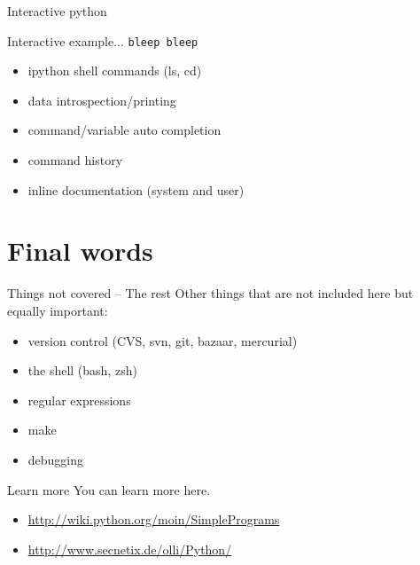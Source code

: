 \documentclass[xetex,10pt]{beamer}
\def\spacer{\vspace*{1em}}
\begin{document}
\begin{frame}[fragile]{Interactive python}

Interactive example... \pause \texttt{bleep bleep}

\spacer
\pause

\begin{itemize}
	\item ipython shell commands (ls, cd)
	\item data introspection/printing
	\item command/variable auto completion
	\item command history
	\item inline documentation (system and user)
\end{itemize}

\end{frame}

\section{Final words}

\begin{frame}[fragile]{Things not covered -- The rest}
	Other things that are not included here but equally important:
	\vspace*{1em}
	\begin{itemize}
		\item version control (CVS, svn, git, bazaar, mercurial)
		\item the shell (bash, zsh)
		\item regular expressions
		\item make
		\item debugging
	\end{itemize}
\end{frame}

\begin{frame}[fragile]{Learn more}
	You can learn more here.
	\vspace*{1em}
	\begin{itemize}
		\item \url{http://wiki.python.org/moin/SimplePrograms}
		\item \url{http://www.secnetix.de/olli/Python/}
	\end{itemize}
\end{frame}
\end{document}
